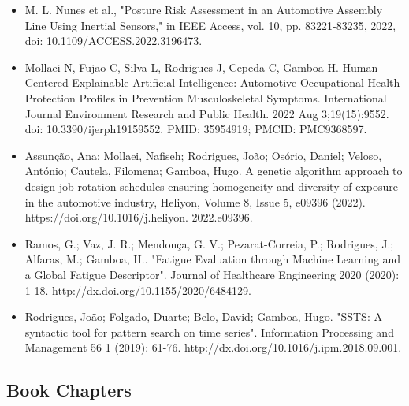 \begin{itemize}

\item M. L. Nunes et al., "Posture Risk Assessment in an Automotive Assembly Line Using Inertial Sensors," in IEEE Access, vol. 10, pp. 83221-83235, 2022, doi: 10.1109/ACCESS.2022.3196473.

\item Mollaei N, Fujao C, Silva L, Rodrigues J, Cepeda C, Gamboa H. Human-Centered Explainable Artificial Intelligence: Automotive Occupational Health Protection Profiles in Prevention Musculoskeletal Symptoms. International Journal Environment Research and Public Health. 2022 Aug 3;19(15):9552. doi: 10.3390/ijerph19159552. PMID: 35954919; PMCID: PMC9368597.

\item Assunção, Ana; Mollaei, Nafiseh; Rodrigues, João; Osório, Daniel; Veloso, António; Cautela, Filomena; Gamboa, Hugo. A genetic algorithm approach to design job rotation schedules ensuring homogeneity and diversity of exposure in the automotive industry, Heliyon, Volume 8, Issue 5, e09396 (2022). https://doi.org/10.1016/j.heliyon.
2022.e09396.

\item Ramos, G.; Vaz, J. R.; Mendonça, G. V.; Pezarat-Correia, P.; Rodrigues, J.; Alfaras, M.; Gamboa, H.. "Fatigue Evaluation through Machine Learning and a Global Fatigue Descriptor". Journal of Healthcare Engineering 2020 (2020): 1-18. http://dx.doi.org/10.1155/2020/6484129.

\item Rodrigues, João; Folgado, Duarte; Belo, David; Gamboa, Hugo. "SSTS: A syntactic tool for pattern search on time series". Information Processing and Management 56 1 (2019): 61-76. http://dx.doi.org/10.1016/j.ipm.2018.09.001.
\end{itemize}

\subsection{Book Chapters}

